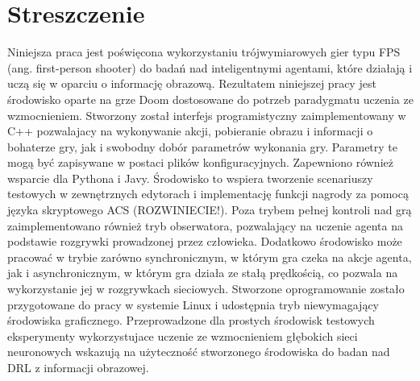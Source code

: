\chapter*{Streszczenie}



Niniejsza praca jest poświęcona wykorzystaniu trójwymiarowych gier typu FPS (ang. first-person shooter) do badań nad inteligentnymi agentami, które działają i uczą się w oparciu o informację obrazową.
Rezultatem niniejszej pracy jest środowisko oparte na grze Doom dostosowane do potrzeb paradygmatu uczenia ze wzmocnieniem.
Stworzony został interfejs programistyczny zaimplementowany w C++ pozwalajacy na wykonywanie akcji, pobieranie obrazu i informacji o bohaterze gry, jak i swobodny dobór parametrów wykonania gry.
Parametry te mogą być zapisywane w postaci plików konfiguracyjnych.
Zapewniono również wsparcie dla Pythona i Javy.
Środowisko to wspiera tworzenie scenariuszy testowych w zewnętrznych edytorach i implementację funkcji nagrody za pomocą języka skryptowego ACS (ROZWINIECIE!).
Poza trybem pełnej kontroli nad grą zaimplementowano również tryb obserwatora, pozwalający na uczenie agenta na podstawie rozgrywki prowadzonej przez człowieka.
Dodatkowo środowisko może pracować w trybie zarówno synchronicznym, w którym gra czeka na akcje agenta, jak i asynchronicznym, w którym gra działa ze stałą prędkością, co pozwala na wykorzystanie jej w rozgrywkach sieciowych.
Stworzone oprogramowanie zostało przygotowane do pracy w systemie Linux i udostępnia tryb niewymagający środowiska graficznego.
Przeprowadzone dla prostych środowisk testowych eksperymenty
wykorzystujace uczenie ze wzmocnieniem głębokich sieci neuronowych
 wskazują na użyteczność stworzonego środowiska do badan nad DRL z informacji obrazowej.


